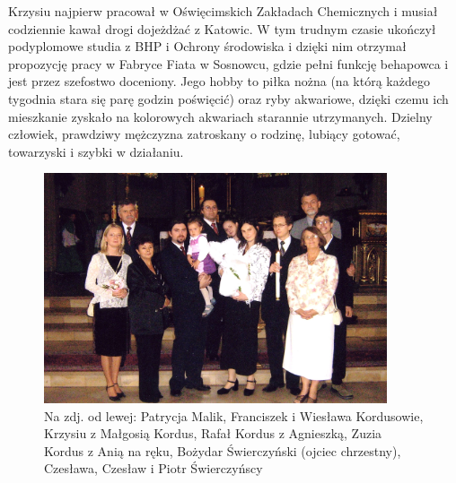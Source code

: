 Krzysiu najpierw pracował w Oświęcimskich Zakładach Chemicznych i musiał codziennie kawał drogi dojeżdżać z Katowic. W tym trudnym czasie ukończył podyplomowe studia z BHP i Ochrony środowiska i dzięki nim otrzymał propozycję pracy w Fabryce Fiata w Sosnowcu, gdzie pełni funkcję behapowca i jest przez szefostwo doceniony. Jego hobby to piłka nożna (na którą każdego tygodnia stara się parę godzin poświęcić) oraz ryby akwariowe, dzięki czemu ich mieszkanie zyskało na kolorowych akwariach starannie utrzymanych. Dzielny człowiek, prawdziwy mężczyzna zatroskany o rodzinę, lubiący gotować, towarzyski i szybki w działaniu.
\begin{figure}[!h]
\begin{center}
\includegraphics[width=0.9\textwidth]{photo/ania_kordus_chrzest.jpg}
\caption[Chrzest Ani Kordus]{Na zdj. od lewej: Patrycja Malik, Franciszek i Wiesława Kordusowie, Krzysiu z Małgosią Kordus, Rafał Kordus z Agnieszką, Zuzia Kordus z Anią na ręku, Bożydar Świerczyński (ojciec chrzestny), Czesława, Czesław i Piotr Świerczyńscy}
\end{center}
\end{figure}

